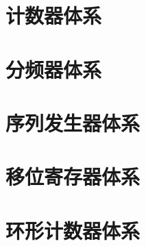 \documentclass[12pt,a4paper,openany]{ctexbook}
\begin{document}


\part{计数器体系}










\part{分频器体系}



\part{序列发生器体系}



\part{移位寄存器体系}



\part{环形计数器体系}
\end{document}
